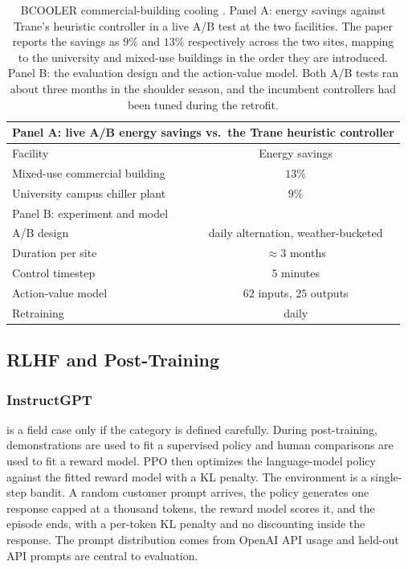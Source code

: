 \begin{table}[t]
\centering
\small
\begin{tabular}{lc}
\toprule
\multicolumn{2}{l}{Panel A: live A/B energy savings vs.\ the Trane heuristic controller} \\
\midrule
Facility & Energy savings \\
\midrule
Mixed-use commercial building & $13\%$ \\
University campus chiller plant & $9\%$ \\
\midrule
\multicolumn{2}{l}{Panel B: experiment and model} \\
\midrule
A/B design & daily alternation, weather-bucketed \\
Duration per site & $\approx 3$ months \\
Control timestep & $5$ minutes \\
Action-value model & $62$ inputs, $25$ outputs \\
Retraining & daily \\
\bottomrule
\end{tabular}
\caption{BCOOLER commercial-building cooling \citep{Luo2022BCOOLER}. Panel A: energy savings against Trane's heuristic controller in a live A/B test at the two facilities. The paper reports the savings as $9\%$ and $13\%$ respectively across the two sites, mapping to the university and mixed-use buildings in the order they are introduced. Panel B: the evaluation design and the action-value model. Both A/B tests ran about three months in the shoulder season, and the incumbent controllers had been tuned during the retrofit.}
\label{tab:bcooler_results}
\end{table}

\subsection{RLHF and Post-Training}

\subsubsection{InstructGPT}
\citet{ouyang2022training} is a field case only if the category is defined carefully. During post-training, demonstrations are used to fit a supervised policy and human comparisons are used to fit a reward model. PPO then optimizes the language-model policy against the fitted reward model with a KL penalty. The environment is a single-step bandit. A random customer prompt arrives, the policy generates one response capped at a thousand tokens, the reward model scores it, and the episode ends, with a per-token KL penalty and no discounting inside the response. The prompt distribution comes from OpenAI API usage and held-out API prompts are central to evaluation.

